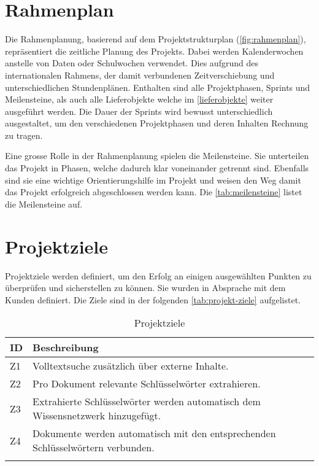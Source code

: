 \section{Rahmenplan}
Die Rahmenplanung, basierend auf dem Projektstrukturplan (\autoref{fig:rahmenplan}), repräsentiert die zeitliche Planung des Projekts. Dabei werden Kalenderwochen anstelle von Daten oder Schulwochen verwendet. Dies aufgrund des internationalen Rahmens, der damit verbundenen Zeitverschiebung und unterschiedlichen Stundenplänen. Enthalten sind alle Projektphasen, Sprints und Meilensteine, als auch alle Lieferobjekte welche im \autoref{lieferobjekte} weiter ausgeführt werden. Die Dauer der Sprints wird bewusst unterschiedlich ausgestaltet, um den verschiedenen Projektphasen und deren Inhalten Rechnung zu tragen.

Eine grosse Rolle in der Rahmenplanung spielen die Meilensteine. Sie unterteilen das Projekt in Phasen, welche dadurch klar voneinander getrennt sind. Ebenfalls sind sie eine wichtige Orientierungshilfe im Projekt und weisen den Weg damit das Projekt erfolgreich abgeschlossen werden kann. Die \autoref{tab:meilensteine} listet die Meilensteine auf.

\section{Projektziele} \label{projektziele}
Projektziele werden definiert, um den Erfolg an einigen ausgewählten Punkten zu überprüfen und sicherstellen zu können. Sie wurden in Absprache mit dem Kunden definiert. Die Ziele sind in der folgenden \autoref{tab:projekt-ziele} aufgelistet.



\begin{longtable}{|p{1cm}  | p{10.5cm}|}
  \hline
    ID &  Beschreibung \\\hline
    Z1 & Volltextsuche zusätzlich über externe Inhalte.\\\hline
    Z2 & Pro Dokument relevante Schlüsselwörter extrahieren.\\\hline
    Z3 & Extrahierte Schlüsselwörter werden automatisch dem Wissensnetzwerk hinzugefügt.\\\hline
    Z4 & Dokumente werden automatisch mit den entsprechenden Schlüsselwörtern verbunden.\\\hline
    \caption{Projektziele}
  \label{tab:projekt-ziele}
\end{longtable}

